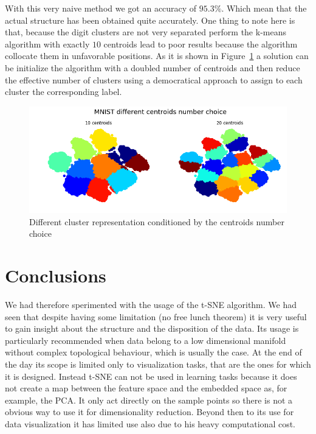 \documentclass[%
 aip,
 jmp,%
 amsmath,amssymb,
 reprint,%
]{revtex4-1}
\begin{document}
With this very naive method we got an accuracy of $95.3\%$. Which mean
that the actual structure has been obtained quite accurately.
One thing to note here is that, because the digit clusters are not very
separated perform the k-means algorithm with exactly $10$ centroids lead
to poor results because the algorithm collocate them in unfavorable
positions. As it is shown in Figure~\ref{fig:centroids}
a solution can be initialize the algorithm with a doubled number of
centroids and then reduce the effective number of clusters using a
democratical approach to assign to each cluster the corresponding label.

\begin{figure}[h]
 \includegraphics[scale=0.3]{images/centroids.png}
 \caption{Different cluster representation conditioned by the centroids number choice}
 \label{fig:centroids}
\end{figure}

\section{Conclusions}
We had therefore sperimented with the usage of the t-SNE algorithm.
We had seen that despite having some limitation (no free lunch theorem)
it is very useful to gain insight about the structure and the disposition
of the data. %
Its usage is particularly recommended when data belong to a low dimensional
manifold without complex topological behaviour, which is usually the case.
At the end of the day its scope is limited only to visualization tasks, that are the ones for which it is designed.
Instead t-SNE can not be used in learning tasks because it does not create a map between the feature space and the embedded
space as, for example, the PCA. It only act directly on the sample points
so there is not a obvious way to use it for dimensionality reduction.
Beyond then to its use for data visualization it has limited use also
due to his heavy computational cost.
\end{document}
